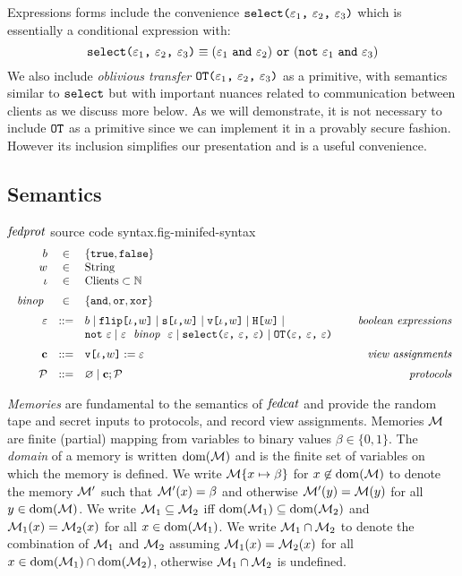 Expressions forms include the convenience
$\texttt{select(} \varepsilon_1 \texttt{,}\ \varepsilon_2 \texttt{,}\ \varepsilon_3 \texttt{)}$ which is essentially a conditional
expression with:
$$
\texttt{select(} \varepsilon_1 \texttt{,}\ \varepsilon_2 \texttt{,}\ \varepsilon_3 \texttt{)} \equiv (\varepsilon_1\ \texttt{and}\ \varepsilon_2)\ \texttt{or}\ (\texttt{not}\ \varepsilon_1\ \texttt{and}\ \varepsilon_3)
$$
We also include \emph{oblivious transfer} $\texttt{OT(} \varepsilon_1 \texttt{,}\ \varepsilon_2 \texttt{,}\ \varepsilon_3 \texttt{)}$ as a primitive,
with semantics similar to $\texttt{select}$ but with important nuances
related to communication between clients as we discuss more below.
As we will demonstrate, it is not necessary to include $\texttt{OT}$
as a primitive since we can implement it in a provably secure
fashion. However its inclusion simplifies our presentation and is a useful
convenience.

\subsection{Semantics}

\begin{fpfig}[t]{$\mathit{fedprot}$ source code syntax.}{fig-minifed-syntax}
$$
\begin{array}{rcl@{\hspace{8mm}}r}
b &\in& \{ \etrue, \efalse \} \\
w &\in& \mathrm{String} \\ 
\cid &\in& \mathrm{Clients} \subset  \mathbb{N} \\[2mm]%
\bop &\in& \{ \eand, \eor, \exor \} \\[2mm]
\be &::=& b \mid \flip{\cid}{w} \mid \secret{\cid}{w} \mid \view{\cid}{w} \mid \oracle{w} \mid & \textit{boolean expressions}\\
& &  \enot\ \be \mid \be\ \bop\ \be \mid \select{\be}{\be}{\be} \mid \OT{\be}{\be}{\be} \\[2mm]
\instr &::=& \eassign{\view{\cid}{w}}{\be} & \textit{view assignments} \\[2mm]
\prog &::=& \varnothing \mid \instr; \prog & \textit{protocols}
\end{array}
$$ 
\end{fpfig}

\emph{Memories} are fundamental to the semantics of $\mathit{fedcat}$ and
provide the random tape and secret inputs to protocols, and record
view assignments. Memories $\mathcal{M}$ are finite (partial) mapping from
variables to binary values $\beta \in \{0,1\}$. The \emph{domain} of a
memory is written $\mathrm{dom}(\mathcal{M})$ and is the finite set of variables on
which the memory is defined. We write $\mathcal{M}\{ x \mapsto \beta\}$ for
$x\not\in\mathrm{dom}(\mathcal{M})$ to denote the memory $\mathcal{M}'$ such that
$\mathcal{M}'(x) = \beta$ and otherwise $\mathcal{M}'(y) = \mathcal{M}(y)$ for all $y
\in \mathrm{dom}(\mathcal{M})$. We write $\mathcal{M}_1 \subseteq \mathcal{M}_2$ iff
$\mathrm{dom}(\mathcal{M}_1) \subseteq \mathrm{dom}(\mathcal{M}_2)$ and $\mathcal{M}_1(x) =
\mathcal{M}_2(x)$ for all $x \in \mathrm{dom}(\mathcal{M}_1)$. We write $\mathcal{M}_1 \cap
\mathcal{M}_2$ to denote the combination of $\mathcal{M}_1$ and $\mathcal{M}_2$
assuming $\mathcal{M}_1(x) = \mathcal{M}_2(x)$ for all $x \in \mathrm{dom}(\mathcal{M}_1)
\cap \mathrm{dom}(\mathcal{M}_2)$, otherwise $\mathcal{M}_1 \cap \mathcal{M}_2$ is undefined.

